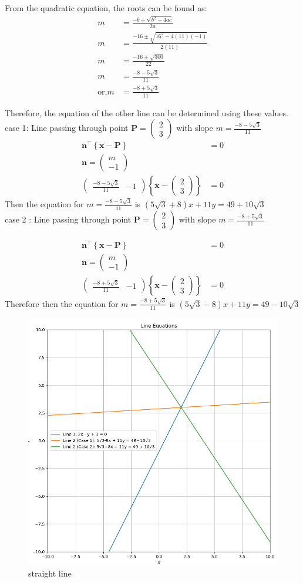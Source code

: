 \documentclass[10pt]{article}
\newcommand{\myvec}[1]{\ensuremath{\begin{pmatrix}#1\end{pmatrix}}}
\let\vec\mathbf
\providecommand{\cbrak}[1]{\ensuremath{\left\{#1\right\}}}
\let\vec\mathbf
\renewcommand{\vec}[1]{\textbf{#1}}
\begin{document}
From the quadratic equation, the roots can be found as:
\begin{align}
m &= \frac{-b \pm \sqrt{b^2 - 4ac}}{2a} \\
m &= \frac{-16 \pm \sqrt{16^2 - 4(11)(-1)}}{2(11)} \\
m &= \frac{-16 \pm \sqrt{300}}{22} \\
m &= \frac{-8 - 5\sqrt{3}}{11} \\
\text{or,}  m &= \frac{-8 + 5\sqrt{3}}{11} 
\end{align}

Therefore, the equation of the other line can be determined using these values.
\\
case 1: Line passing through point  $\vec{P} = \myvec{ 2 \\ 3 }$ with slope $m=\frac{-8 - 5\sqrt{3}}{11}$
\begin{align}
    \vec{n}^\top\cbrak{{\vec{x}-\vec{P}}}&= 0 \\
    \vec{n} = \myvec{ m \\ -1 } \\
    \myvec{ \frac{-8 - 5\sqrt{3}}{11} & -1 }\cbrak{\vec{x}-\myvec{ 2 \\ 3 }} &= 0
\end{align}
Then the equation for $m=\frac{-8 - 5\sqrt{3}}{11}$ is  $(5\sqrt{3}+8)x+11y=49+10\sqrt{3}$
\\
case 2 : Line passing through point $\vec{P} = \myvec{ 2 \\ 3 }$ with slope $m =\frac{-8 + 5\sqrt{3}}{11}$

\begin{align}
     \vec{n}^\top\cbrak{{\vec{x}-\vec{P}}}&= 0 \\
    \vec{n} = \myvec{ m \\ -1 } \\
    \myvec{ \frac{-8 + 5\sqrt{3}}{11} & -1 }\cbrak{\vec{x}-\myvec{ 2 \\ 3 }} &= 0
\end{align}
Therefore then  the equation for $m=\frac{-8 + 5\sqrt{3}}{11}$  is   $(5\sqrt{3}-8)x+11y=49-10\sqrt{3}$

\begin{figure}
    \centering
    \includegraphics[width=\columnwidth]{line.png}
    \caption{straight line}
    \label{fig:enter-label}
\end{figure}
\end{document}
